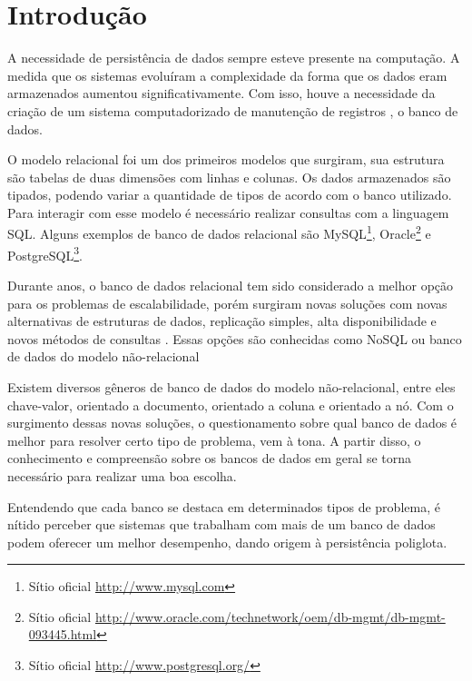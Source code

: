 \chapter{Introdução}\label{chap:introducao}
A necessidade de persistência de dados sempre esteve presente na computação. A medida que os sistemas evoluíram a complexidade da forma que os dados eram armazenados aumentou significativamente. Com isso, houve a necessidade da criação de um sistema computadorizado de manutenção de registros \cite{CJDate}, o banco de dados.

O modelo relacional foi um dos primeiros modelos que surgiram, sua estrutura são tabelas de duas dimensões com linhas e colunas. Os dados armazenados são tipados, podendo variar a quantidade de tipos de acordo com o banco utilizado. Para interagir com esse modelo é necessário realizar consultas com a linguagem \ac{SQL}. Alguns exemplos de banco de dados relacional são MySQL\footnote{Sítio oficial  \url{http://www.mysql.com}}, Oracle\footnote{Sítio oficial  \url{http://www.oracle.com/technetwork/oem/db-mgmt/db-mgmt-093445.html}} e PostgreSQL\footnote{Sítio oficial \url{http://www.postgresql.org/}}.

Durante anos, o banco de dados relacional tem sido considerado a melhor opção para os problemas de escalabilidade, porém surgiram novas soluções com novas alternativas de estruturas de dados, replicação simples, alta disponibilidade e novos métodos de consultas \cite{SDSW}. Essas opções são conhecidas como NoSQL ou banco de dados do modelo não-relacional

Existem diversos gêneros de banco de dados do modelo não-relacional, entre eles chave-valor, orientado a documento, orientado a coluna e orientado a nó. Com o surgimento dessas novas soluções, o questionamento sobre qual banco de dados é melhor para resolver certo tipo de problema, vem à tona. A partir disso, o conhecimento e compreensão sobre os bancos de dados em geral se torna necessário para realizar uma boa escolha.

Entendendo que cada banco se destaca em determinados tipos de problema, é nítido perceber que sistemas que trabalham com mais de um banco de dados podem oferecer um melhor desempenho, dando origem à persistência poliglota.

